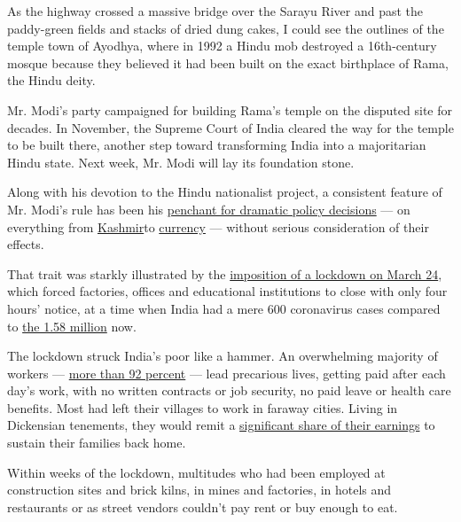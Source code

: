 As the highway crossed a massive bridge over the Sarayu River and past
the paddy-green fields and stacks of dried dung cakes, I could see the
outlines of the temple town of Ayodhya, where in 1992 a Hindu mob
destroyed a 16th-century mosque because they believed it had been built
on the exact birthplace of Rama, the Hindu deity.

Mr. Modi's party campaigned for building Rama's temple on the disputed
site for decades. In November, the Supreme Court of India cleared the
way for the temple to be built there, another step toward transforming
India into a majoritarian Hindu state. Next week, Mr. Modi will lay its
foundation stone.

Along with his devotion to the Hindu nationalist project, a consistent
feature of Mr. Modi's rule has been his
\href{https://www.nytimes3xbfgragh.onion/2020/05/27/opinion/india-modi-coronavirus.html}{penchant
for dramatic policy decisions} --- on everything from
\href{https://www.nytimes3xbfgragh.onion/2019/08/15/opinion/sunday/kashmir-siege-modi.html}{Kashmir}to
\href{https://www.nytimes3xbfgragh.onion/2016/11/27/opinion/in-india-black-money-makes-for-bad-policy.html}{currency}
--- without serious consideration of their effects.

That trait was starkly illustrated by the
\href{https://www.nytimes3xbfgragh.onion/2020/03/25/opinion/india-coronavirus-lockdown.html}{imposition
of a lockdown on March 24}, which forced factories, offices and
educational institutions to close with only four hours' notice, at a
time when India had a mere 600 coronavirus cases compared to
\href{https://www.ndtv.com/india-news/coronavirus-over-50-000-cases-in-india-in-24-hours-for-the-first-time-15-83-lakh-total-cases-so-far-over-10-lakh-recoveries-2271144}{the
1.58 million} now.

The lockdown struck India's poor like a hammer. An overwhelming majority
of workers ---
\href{https://www.magzter.com/article/Business/Forbes-India/Work-In-Progress}{more
than 92 percent} --- lead precarious lives, getting paid after each
day's work, with no written contracts or job security, no paid leave or
health care benefits. Most had left their villages to work in faraway
cities. Living in Dickensian tenements, they would remit a
\href{https://www.livemint.com/news/india/why-india-s-migrants-deserve-a-better-deal-11589818749274.html}{significant
share of their earnings} to sustain their families back home.

Within weeks of the lockdown, multitudes who had been employed at
construction sites and brick kilns, in mines and factories, in hotels
and restaurants or as street vendors couldn't pay rent or buy enough to
eat.

